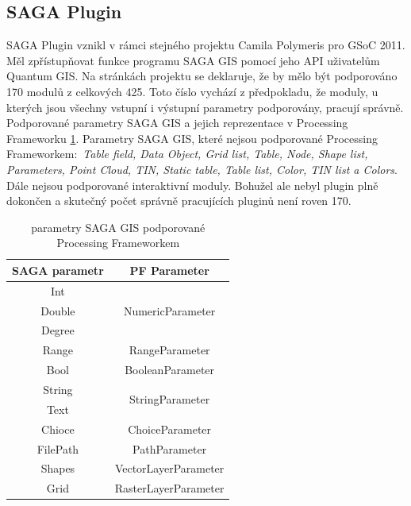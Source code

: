\subsection{SAGA Plugin}
SAGA Plugin vznikl v rámci stejného projektu Camila Polymeris pro GSoC
2011. Měl zpřístupňovat funkce programu SAGA GIS pomocí jeho API
uživatelům Quantum GIS. Na stránkách
projektu \cite{pf:supportedModules} se deklaruje, že by mělo být
podporováno 170 modulů z celkových 425. Toto číslo vychází z
předpokladu, že moduly, u kterých jsou všechny vstupní i výstupní
parametry podporovány, pracují správně. Podporované parametry SAGA GIS
a jejich reprezentace v Processing
Frameworku \ref{tab:saga_parameters}. Parametry SAGA GIS, které nejsou
podporované Processing Frameworkem$:$ \textit{Table field, Data
Object, Grid list, Table, Node, Shape list, Parameters, Point Cloud,
TIN, Static table, Table list, Color, TIN list a Colors}. Dále nejsou
podporované interaktivní moduly. Bohužel ale nebyl plugin plně
dokončen a skutečný počet správně pracujících pluginů není roven
170. \\

\begin{table}[h]
	\centering
	\begin{tabular}{|c|c|}
		\hline
		\textbf{SAGA parametr} & \textbf{PF Parameter} \\
		\hline
		\hline
		Int & \multirow{3}{*}{NumericParameter}\\
		Double & \\
		Degree & \\
		\hline				
		Range & RangeParameter\\	
		\hline
		Bool & BooleanParameter\\		
		\hline
		String & \multirow{2}{*}{StringParameter}\\
		Text & \\
		\hline
		Chioce & ChoiceParameter\\
		\hline
		FilePath & PathParameter\\
		\hline
		Shapes & VectorLayerParameter\\
		\hline
		Grid & RasterLayerParameter\\		
		\hline	
	\end{tabular}
	\caption{parametry SAGA GIS podporované Processing Frameworkem}
	\label{tab:saga_parameters}
\end{table}



